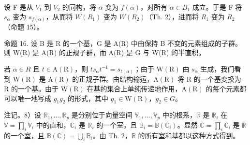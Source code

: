 设 F 是从 \(V_{1}\) 到 \(V_{2}\) 的同构，将 \(\alpha\) 变为 \(f(\alpha)\)，对所有 \(\alpha \in B_{1}\) 成立。于是 F 将 \(s_{\alpha}\) 变为 \(s_{f(\alpha)}\)，从而将 \(W(R_{1})\) 变为 \(W(R_{2})\)（Th. 2），进而将 \(R_{1}\) 变为 \(R_{2}\)（命题 15）。

命题 16. 设 B 是 R 的一个基，G 是 A(R) 中由保持 B 不变的元素组成的子群。则 W(R) 是 A(R) 的正规子群，而 A(R) 是 G 与 W(R) 的半直积。

若 \(\alpha\in R\) 且 \(t\in\mathrm{A}(\mathrm{R})\)，则 \(ts_{\alpha}t^{-1}=s_{t(\alpha)}\)；由于 \(\mathrm{W}(\mathrm{R})\) 由 \(s_{\alpha}\) 生成，我们看到 \(\mathrm{W}(\mathrm{R})\) 是 \(\mathrm{A}(\mathrm{R})\) 的正规子群。由结构输运，\(\mathrm{A}(\mathrm{R})\) 将 R 的一个基变换为 R 的一个基。由于 \(\mathrm{W}(\mathrm{R})\) 在基的集合上单纯传递地作用，\(\mathrm{A}(\mathrm{R})\) 的每个元素都可以唯一地写成 \(g_{1}g_{2}\) 的形式，其中 \(g_{1}\in\mathrm{W}(\mathrm{R})\)，\(g_{2}\in G\)。

注记。8）设 \(\mathbb{R}_1, \ldots, \mathbb{R}_p\) 是分别位于向量空间 \(\mathbb{V}_1, \ldots, \mathbb{V}_p\) 中的根系，\(\mathbb{R}\) 是 \(\mathbb{R}_i\) 在 \(\mathbb{V} = \prod_i \mathbb{V}_i\) 中的直和，\(\mathbb{C}_i\) 是 \(\mathbb{R}_i\) 的一个室，且 \(\mathbb{B}_i = \mathbb{B}(\mathbb{C}_i)\)。显然 \(\mathbb{C} = \prod_i \mathbb{C}_i\) 是 \(\mathbb{R}\) 的一个室，且 \(\mathbb{B}(\mathbb{C}) = \bigcup_i \mathbb{B}_i\)。由 Th. 2，\(\mathbb{R}\) 的所有室和基都以这种方式得到。

